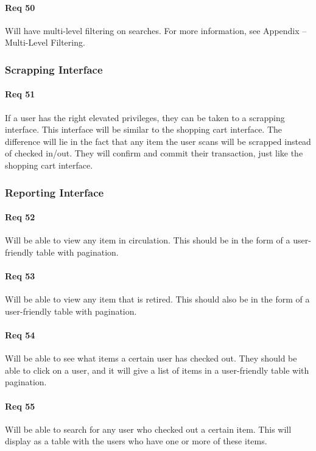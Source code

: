 \documentclass[10pt, onecolumn, twoside, peerreview]{IEEEtran}
\begin{document}
\paragraph*{Req 50} Will have multi-level filtering on searches. For more information, see Appendix – Multi-Level Filtering.\\

\subsubsection{Scrapping Interface}
\paragraph*{Req 51} If a user has the right elevated privileges, they can be taken to a scrapping interface. This interface will be similar
to the shopping cart interface. The difference will lie in the fact that any item the user scans will be scrapped
instead of checked in/out. They will confirm and commit their transaction, just like the shopping cart interface.\\

\subsubsection{Reporting Interface}
\paragraph*{Req 52} Will be able to view any item in circulation. This should be in the form of a user-friendly table with pagination.\\

\paragraph*{Req 53} Will be able to view any item that is retired. This should also be in the form of a user-friendly table with
pagination.\\

\paragraph*{Req 54} Will be able to see what items a certain user has checked out. They should be able to click on a user, and it will give
a list of items in a user-friendly table with pagination.\\

\paragraph*{Req 55} Will be able to search for any user who checked out a certain item. This will display as a table with the users who
have one or more of these items.\\
\end{document}
